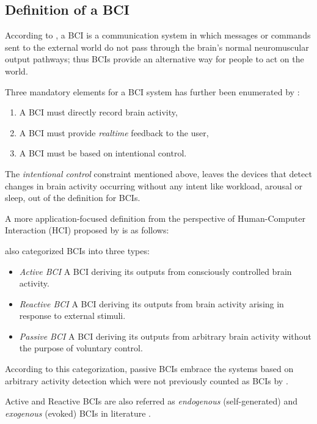 \documentclass[12pt]{article}
\newcommand\mysubsection[1]{\subsection{#1}}
\numberwithin{equation}{section}
\numberwithin{figure}{section}
\numberwithin{table}{section}
\begin{document}
\mysubsection{Definition of a BCI}
\par{
    According to \citet{wolpaw_braincomputer_2002}, a BCI is a communication system
    in which messages or commands sent to the external world do not pass through the
    brain's normal neuromuscular output pathways; thus BCIs provide an alternative
    way for people to act on the world.
}
\par{
    Three mandatory elements for a BCI system has further been enumerated by \citet{graimann_braincomputer_2010}:
    \begin{enumerate}
        \item A BCI must directly record brain activity,
        \item A BCI must provide \emph{realtime} feedback to the user,
        \item A BCI must be based on intentional control.
    \end{enumerate}
    The \emph{intentional control} constraint mentioned above, leaves the devices
    that detect changes in brain activity occurring without any intent like
    workload, arousal or sleep, out of the definition for BCIs.
}
\par{
    A more application-focused definition from the perspective of
    Human-Computer Interaction (HCI) proposed by \citet{zander_enhancing_2010}
    is as follows:
}
\par{
    \citet{zander_enhancing_2008} also categorized BCIs into three types:
    \begin{itemize}
        \item \emph{Active BCI} A BCI deriving its outputs from consciously controlled brain activity.
        \item \emph{Reactive BCI} A BCI deriving its outputs from brain activity arising in response to external stimuli.
        \item \emph{Passive BCI} A BCI deriving its outputs from arbitrary brain activity without the purpose of voluntary control.
    \end{itemize}
    According to this categorization, passive BCIs embrace the systems
    based on arbitrary activity detection which were not previously counted as BCIs by \citet{graimann_braincomputer_2010}.
}
\par{
    Active and Reactive BCIs are also referred as \emph{endogenous} (self-generated) and \emph{exogenous} (evoked)
    BCIs in literature \citep{jackson_neural_2010}.
}
\end{document}

